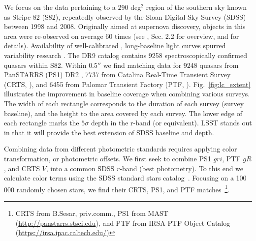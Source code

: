 \documentclass[twocolumn]{aastex62}
\begin{document}
We focus on the data pertaining to a 290 deg$^{2}$ region of the southern sky known as Stripe 82 (S82), repeatedly observed by the Sloan Digital Sky Survey (SDSS) between 1998 and 2008. Originally aimed at supernova discovery, objects in this area were re-observed on average 60 times (see \citealt{macleod2012}, Sec. 2.2 for overview, and \citealt{annis2014} for details). Availability of well-calibrated \citep{ivezic2007}, long-baseline light curves spurred variability research \citep{sesar2007}. The DR9 catalog \citep{schneider2008} contains 9258 spectroscopically confirmed quasars within S82. Within  $0.5 ''$  we find matching data for 9248 quasars from  PanSTARRS (PS1) DR2 \citep{chambers2011,flewelling2018}, 7737 from Catalina Real-Time Transient Survey (CRTS, \citealt{drake2009}), and  6455 from Palomar Transient Factory (PTF, \citealt{rau2009}). Fig.~\ref{fig:lc_extent} illustrates the improvement in baseline coverage when combining various surveys. The width of each rectangle corresponds to the duration of each survey (survey baseline), and the height to the area covered by each survey. The lower edge of each rectangle marks the $5\sigma$ depth in the r-band (or equivalent). LSST stands out in that it will provide the best extension of SDSS baseline and depth.  



\begin{figure*} %
\caption{An illustration of survey baseline, sky area covered, and depth. The width of each rectangle corresponds to the extent of real or simulated light curves for Stripe 82 quasars for each survey. This includes SDSS DR7, CRTS DR2, PS1 DR2, PTF DR2, ZTF DR1, and for LSST the full 10-year survey. The lower edge of each rectangle (marked by a  thick dashed line) corresponds to the $5\sigma$ limiting magnitude (SDSS $r$, PS1 $r$, PTF $R$, ZTF $r$, LSST $r$, CRTS $V$). The vertical extent of each rectangle corresponds to the total survey area (for SDSS, up to DR15).  Note how PS1 and PTF extend the baseline of SDSS by approximately $50\%$, and how inclusion of LSST roughly triples the SDSS baseline. For reference, the area covered by LSST is $20 000$ sq.deg.}
\label{fig:lc_extent}
\end{figure*} 


Combining data from different photometric standards requires applying color transformation, or photometric offsets. We first seek to combine PS1 $gri$,  PTF $gR$, and CRTS $V$, into a common SDSS $r$-band (best photometry). To this end we calculate  color terms using the SDSS standard stars catalog~\citep{ivezic2007}. Focusing on a 100 000 randomly chosen stars, we find their CRTS, PS1, and PTF matches~\footnote{CRTS from B.Sesar, priv.comm., PS1 from MAST (\url{http://panstarrs.stsci.edu}), and PTF from IRSA PTF Object Catalog (\url{https://irsa.ipac.caltech.edu/})}. 
\end{document}
